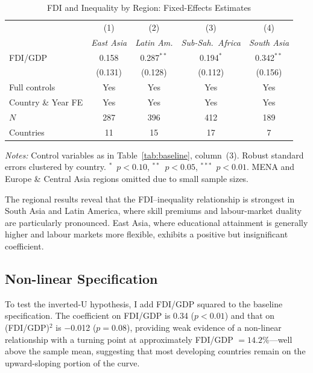 \documentclass[12pt,a4paper]{article}
\begin{document}
\begin{appendices}
\begin{table}[H]
\centering
\caption{FDI and Inequality by Region: Fixed-Effects Estimates}
\label{tab:regional}
\begin{threeparttable}
\begin{tabular}{@{} l cccc @{}}
\toprule
 & (1) & (2) & (3) & (4) \\
 & \textit{East Asia} & \textit{Latin Am.} & \textit{Sub-Sah.\ Africa} & \textit{South Asia} \\
\midrule
FDI/GDP & 0.158 & 0.287$^{**}$ & 0.194$^{*}$ & 0.342$^{**}$ \\
        & (0.131) & (0.128) & (0.112) & (0.156) \\[4pt]
\midrule
Full controls & Yes & Yes & Yes & Yes \\
Country \& Year FE & Yes & Yes & Yes & Yes \\
$N$    & 287 & 396 & 412 & 189 \\
Countries & 11 & 15 & 17 & 7 \\
\bottomrule
\end{tabular}
\begin{tablenotes}[flushleft]\footnotesize
\item \textit{Notes:} Control variables as in Table~\ref{tab:baseline}, column~(3).  Robust standard errors clustered by country.  $^{*}$~$p<0.10$, $^{**}$~$p<0.05$, $^{***}$~$p<0.01$.  MENA and Europe \& Central Asia regions omitted due to small sample sizes.
\end{tablenotes}
\end{threeparttable}
\end{table}

The regional results reveal that the FDI--inequality relationship is strongest in South Asia and Latin America, where skill premiums and labour-market duality are particularly pronounced.  East Asia, where educational attainment is generally higher and labour markets more flexible, exhibits a positive but insignificant coefficient.

\subsection{Non-linear Specification}

To test the \citet{Figini2011} inverted-U hypothesis, I add FDI/GDP squared to the baseline specification.  The coefficient on FDI/GDP is 0.34 ($p < 0.01$) and that on (FDI/GDP)$^2$ is $-$0.012 ($p = 0.08$), providing weak evidence of a non-linear relationship with a turning point at approximately FDI/GDP $= 14.2$\%---well above the sample mean, suggesting that most developing countries remain on the upward-sloping portion of the curve.

\end{appendices}
\end{document}
